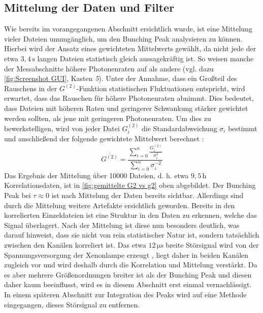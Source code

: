 \subsection{Mittelung der Daten und Filter}
\label{ssec:mittelung und filter}
Wie bereits im vorangegangenen Abschnitt ersichtlich wurde, ist eine Mittelung vieler Dateien unumgänglich, um den Bunching Peak analysieren zu können. 
Hierbei wird der Ansatz eines gewichteten Mittelwerts gewählt, da nicht jede der etwa $3{,}4\,\mathrm{s}$ langen Dateien statistisch gleich aussagekräftig ist. 
So weisen manche der Messabschnitte höhere Photonenraten auf als andere (vgl. dazu \autoref{fig:Screenshot GUI}, Kasten \emph{5}). 
Unter der Annahme, dass ein Großteil des Rauschens in der $G^{(2)}$-Funktion statistischen Fluktuationen entspricht, wird erwartet, dass das Rauschen für höhere Photonenraten abnimmt. 
Dies bedeutet, dass Dateien mit höheren Raten und geringerer Schwankung stärker gewichtet werden sollten, als jene mit geringeren Photonenraten. 
Um dies zu bewerkstelligen, wird von jeder Datei $G^{(2)}_i$ die Standardabweichung $\sigma_i$ bestimmt und anschließend der folgende gewichtete Mittelwert berechnet \cite{cochranProblemsArisingAnalysis1937}:
\begin{equation}
    \overline{G^{(2)}} = \frac{\sum_{i=0}^{n}\frac{G^{(2)}_i}{\sigma_i^2}}{\sum_{i=0}^{n} \sigma_i^{-2}}
\end{equation}
Das Ergebnis der Mittelung über 10000 Dateien, d. h. etwa $9{,}5$\,h Korrelationsdaten, ist in \autoref{fig:gemittelte G2 vs g2} oben abgebildet. 
Der Bunching Peak bei $\tau\approx 0$ ist nach Mittelung der Daten bereits sichtbar. 
Allerdings sind durch die Mittelung weitere Artefakte ersichtlich geworden. 
Bereits in den korrelierten Einzeldateien ist eine Struktur in den Daten zu erkennen, welche das Signal überlagert. 
Nach der Mittelung ist diese nun besonders deutlich, was darauf hinweist, dass sie nicht von rein statistischer Natur ist, sondern tatsächlich zwischen den Kanälen korreliert ist. 
Das etwa $12\,\mathrm{\mu s}$ breite Störsignal wird von der Spannungsversorgung der Xenonlampe erzeugt \cite{zmijaOpticalIntensityInterferometry2021}, liegt daher in beiden Kanälen zugleich vor und wird deshalb durch die Korrelation und Mittelung verstärkt. 
Da es aber mehrere Größenordnungen breiter ist als der Bunching Peak und diesen daher kaum beeinflusst, wird es in diesem Abschnitt erst einmal vernachlässigt. 
In einem späteren Abschnitt zur Integration des Peaks wird auf eine Methode eingegangen, dieses Störsignal zu entfernen. \\
